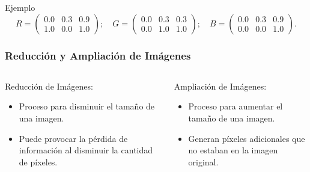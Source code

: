 \begin{frame}{Ejemplo}
    \[
        R = \begin{pmatrix}
            0.0& 0.3& 0.9\\
            1.0& 0.0& 1.0
        \end{pmatrix};\quad
        G = \begin{pmatrix}
            0.0& 0.3& 0.3\\
            0.0& 1.0& 1.0
        \end{pmatrix};\quad
        B = \begin{pmatrix}
            0.0& 0.3& 0.9\\
            0.0& 0.0& 1.0
        \end{pmatrix}.
    \]
    \pause  
    \begin{center}
    \end{center}
\end{frame}

\begin{frame}
    \frametitle{Reducción y Ampliación de Imágenes}

    \begin{columns}
    \begin{block}{Reducción de Imágenes:}
        \begin{itemize}
            \item Proceso para disminuir el tamaño de una imagen.
            \item Puede provocar la pérdida de información al disminuir la cantidad de píxeles.
        \end{itemize}
    \end{block}
    
    \begin{block}{Ampliación de Imágenes:}
        \begin{itemize}
            \item Proceso para aumentar el tamaño de una imagen.
            \item Generan píxeles adicionales que no estaban en la imagen original.
        \end{itemize}
    \end{block}
    
    \end{columns}

\end{frame}


